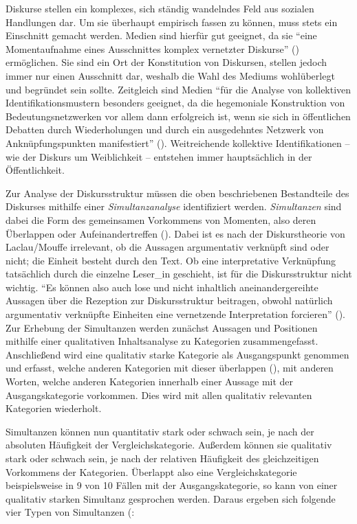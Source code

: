 \documentclass[12pt, titlepage=true, toc=bib]{scrartcl}
\begin{document}
Diskurse stellen ein komplexes, sich ständig wandelndes Feld aus sozialen Handlungen dar. Um sie überhaupt empirisch fassen zu können, muss stets ein Einschnitt gemacht werden. Medien sind hierfür gut geeignet, da sie "`eine Momentaufnahme eines Ausschnittes komplex vernetzter Diskurse"' (\cite[8]{bruell_chancen_2006}) ermöglichen. Sie sind ein Ort der Konstitution von Diskursen, stellen jedoch immer nur einen Ausschnitt dar, weshalb die Wahl des Mediums wohlüberlegt und begründet sein sollte. Zeitgleich sind Medien "`für die Analyse von kollektiven Identifikationsmustern besonders geeignet, da die hegemoniale Konstruktion von Bedeutungsnetzwerken vor allem dann erfolgreich ist, wenn sie sich in öffentlichen Debatten durch Wiederholungen und durch ein ausgedehntes Netzwerk von Anknüpfungspunkten manifestiert"' (\cite[202]{nonhoff_kollektive_2007}). Weitreichende kollektive Identifikationen -- wie der Diskurs um Weiblichkeit -- entstehen immer hauptsächlich in der Öffentlichkeit. 

Zur Analyse der Diskursstruktur müssen die oben beschriebenen Bestandteile des Diskurses mithilfe einer \textit{Simultanzanalyse} identifiziert werden. \textit{Simultanzen} sind dabei die Form des gemeinsamen Vorkommens von Momenten, also deren Überlappen oder Aufeinandertreffen (\cite[11][vgl.]{bruell_chancen_2006}). Dabei ist es nach der Diskurstheorie von Laclau/Mouffe irrelevant, ob die Aussagen argumentativ verknüpft sind oder nicht; die Einheit besteht durch den Text. Ob eine interpretative Verknüpfung tatsächlich durch die einzelne Leser\_in geschieht, ist für die Diskursstruktur nicht wichtig. "`Es können also auch lose und nicht inhaltlich aneinandergereihte Aussagen über die Rezeption zur Diskursstruktur beitragen, obwohl natürlich argumentativ verknüpfte Einheiten eine vernetzende Interpretation forcieren"' (\cite[9]{bruell_chancen_2006}). Zur Erhebung der Simultanzen werden zunächst Aussagen und Positionen mithilfe einer qualitativen Inhaltsanalyse zu Kategorien zusammengefasst. Anschließend wird eine qualitativ starke Kategorie als Ausgangspunkt genommen und erfasst, welche anderen Kategorien mit dieser überlappen (\cite[vgl.][205]{nonhoff_kollektive_2007}), mit anderen Worten, welche anderen Kategorien innerhalb einer Aussage mit der Ausgangskategorie vorkommen. Dies wird mit allen qualitativ relevanten Kategorien wiederholt.

Simultanzen können nun quantitativ stark oder schwach sein, je nach der absoluten Häufigkeit der Vergleichskategorie. Außerdem können sie qualitativ stark oder schwach sein, je nach der relativen Häufigkeit des gleichzeitigen Vorkommens der Kategorien. Überlappt also eine Vergleichskategorie beispielsweise in 9 von 10 Fällen mit der Ausgangskategorie, so kann von einer qualitativ starken Simultanz gesprochen werden. Daraus ergeben sich folgende vier Typen von Simultanzen (\cite[vgl.][12]{bruell_chancen_2006}:
\end{document}
